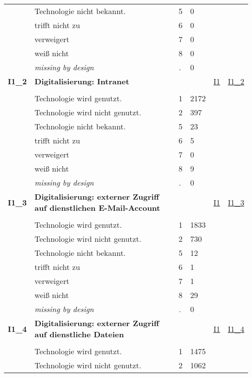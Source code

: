 \begin{longtable}{| L{2.45cm} | L{6cm} | C{1.5cm} | R{1cm} | C{2.25cm} | C{2.25cm} |}
   & Technologie nicht bekannt. & 5 & 0 &  &  \\ 
   & trifft nicht zu & 6 & 0 &  &  \\ 
   & verweigert & 7 & 0 &  &  \\ 
   & weiß nicht & 8 & 0 &  &  \\ 
   & \textit{missing by design} & \textit{.} & 0 &  &  \\ 
   \midrule
\textbf{I1\_2}\label{var:I1:2} & \textbf{Digitalisierung: Intranet} &  &  & \hyperref[I1]{I1} & \hyperref[var:suf:I1:2]{I1\_2} \\ 
   &  &  &  &  &  \\ 
   & Technologie wird genutzt. & 1 & 2172 &  &  \\ 
   & Technologie wird nicht genutzt. & 2 & 397 &  &  \\ 
   & Technologie nicht bekannt. & 5 & 23 &  &  \\ 
   & trifft nicht zu & 6 & 5 &  &  \\ 
   & verweigert & 7 & 0 &  &  \\ 
   & weiß nicht & 8 & 9 &  &  \\ 
   & \textit{missing by design} & \textit{.} & 0 &  &  \\ 
   \midrule
\textbf{I1\_3}\label{var:I1:3} & \textbf{Digitalisierung: externer Zugriff auf dienstlichen E-Mail-Account} &  &  & \hyperref[I1]{I1} & \hyperref[var:suf:I1:3]{I1\_3} \\ 
   &  &  &  &  &  \\ 
   & Technologie wird genutzt. & 1 & 1833 &  &  \\ 
   & Technologie wird nicht genutzt. & 2 & 730 &  &  \\ 
   & Technologie nicht bekannt. & 5 & 12 &  &  \\ 
   & trifft nicht zu & 6 & 1 &  &  \\ 
   & verweigert & 7 & 1 &  &  \\ 
   & weiß nicht & 8 & 29 &  &  \\ 
   & \textit{missing by design} & \textit{.} & 0 &  &  \\ 
   \midrule
\textbf{I1\_4}\label{var:I1:4} & \textbf{Digitalisierung: externer Zugriff auf dienstliche Dateien} &  &  & \hyperref[I1]{I1} & \hyperref[var:suf:I1:4]{I1\_4} \\ 
   &  &  &  &  &  \\ 
   & Technologie wird genutzt. & 1 & 1475 &  &  \\ 
   & Technologie wird nicht genutzt. & 2 & 1062 &  &  \\ 

\end{longtable}
